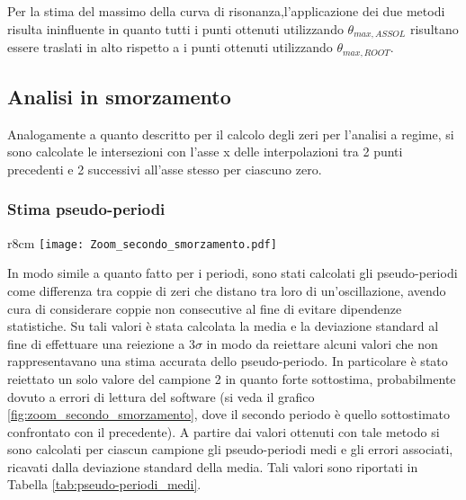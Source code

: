 \documentclass[a4paper,11pt,oneside]{article}
\begin{document}
Per la stima del massimo della curva di risonanza,l'applicazione dei due metodi risulta ininfluente in quanto tutti i punti ottenuti utilizzando  $\theta_ {max,ASSOL}$ risultano essere traslati in alto rispetto a i punti ottenuti utilizzando  $\theta_ {max,ROOT}$.


\newpage






\subsection{Analisi in smorzamento}
Analogamente a quanto descritto per il calcolo degli zeri per l'analisi a regime, si sono calcolate le intersezioni con l'asse x delle interpolazioni tra 2 punti precedenti e 2 successivi all'asse stesso per ciascuno zero.

\subsubsection{Stima pseudo-periodi}

\begin{wrapfigure}{r}{8cm}
    \centering
    \texttt{[image: Zoom\_secondo\_smorzamento.pdf]}
    \caption{Confronto pseudo-periodi - $2^o$ campione}
    \label{fig:zoom_secondo_smorzamento}
\end{wrapfigure}

In modo simile a quanto fatto per i periodi, sono stati calcolati gli pseudo-periodi come differenza tra coppie di zeri che distano tra loro di un'oscillazione, avendo cura di considerare coppie non consecutive al fine di evitare dipendenze statistiche. Su tali valori è stata calcolata la media e la deviazione standard al fine di effettuare una reiezione a $3\sigma$ in modo da reiettare alcuni valori che non rappresentavano una stima accurata dello pseudo-periodo. In particolare è stato reiettato un solo valore del campione 2 in quanto forte sottostima, probabilmente dovuto a errori di lettura del software (si veda il grafico \ref{fig:zoom_secondo_smorzamento}, dove il secondo periodo è quello sottostimato confrontato con il precedente).
A partire dai valori ottenuti con tale metodo si sono calcolati per ciascun campione  gli pseudo-periodi medi e gli errori associati, ricavati dalla deviazione standard della media. Tali valori sono riportati in Tabella \ref{tab:pseudo-periodi_medi}.
\end{document}
